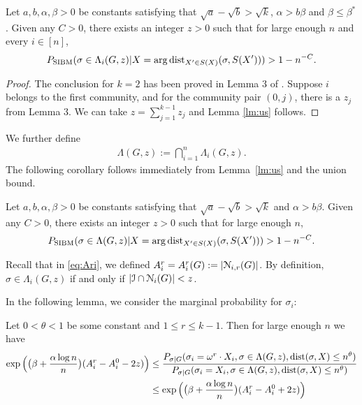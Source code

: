\documentclass{article}
\begin{document}
\begin{lemma} \label{lm:us}
	Let $a,b,\alpha,\beta> 0$ be constants satisfying that $\sqrt{a}-\sqrt{b} > \sqrt{k}$, $\alpha>b\beta$ and $\beta\le \beta^\ast$.
	Given any $C>0$, there exists an integer $z>0$ such that for large enough $n$ and every $i\in[n]$, 
	\begin{equation} \label{eq:zr}
	P_{\operatorname{SIBM}} (\sigma\in \Lambda_i(G, z)
	| X = \arg\operatorname{dist}_{X'\in S(X)}(\sigma, S(X')))
	> 1 - n^{-C} .
	\end{equation}
\end{lemma}
\begin{proof}
	The conclusion for $k=2$ has been proved in Lemma 3 of \cite{ye2020exact}. Suppose $i$ belongs to the first community, and for the community
	pair $(0, j)$, there is a $z_{j}$ from Lemma 3.
	We can take $z = \sum_{j=1}^{k-1} z_j$ and Lemma \ref{lm:us} follows.
\end{proof}
We further define 
\begin{align*}
\Lambda(G, z) :=
\bigcap_{i=1}^n
\Lambda_i(G, z) .
\end{align*}
The following corollary follows immediately from Lemma~\ref{lm:us} and the union bound.
\begin{corollary} \label{cr:1}
	Let $a,b,\alpha,\beta> 0$ be constants satisfying that $\sqrt{a}-\sqrt{b} > \sqrt{k}$ and $\alpha>b\beta$.
	Given any $C>0$, there exists an integer $z>0$ such that for large enough $n$, 
	$$
	P_{\operatorname{SIBM}} (\sigma\in \Lambda(G, z)
	| X = \arg\operatorname{dist}_{X'\in S(X)}(\sigma, S(X')) )
	> 1 - n^{-C} .
	$$
\end{corollary}

Recall that in \eqref{eq:Ari}, we defined $A^r_i=A^r_i(G):=|\mathcal{N}_{i,r}(G)|$.
By definition, $\sigma \in  \Lambda_i(G,z)$ if and only if $|\mathcal{I}\cap \mathcal{N}_i(G)| < z$.

In the following lemma, we consider the marginal probability for $\sigma_i$:
\begin{lemma} \label{lm:et}
	Let $0<\theta<1$ be some constant and $1\leq r \leq k-1$. Then for large enough $n$ we have
	\begin{align*}
	\exp\Big(\big(\beta+\frac{\alpha\log n}{n} \big) (A^r_i-A^0_i - 2z) \Big) & \le 
	\frac{P_{\sigma|G}(\sigma_i= \omega^r \cdot X_i, \sigma\in \Lambda(G,z) ,\operatorname{dist}(\sigma, X) \le n^{\theta} ) } 
	{ P_{\sigma|G}(\sigma_i=X_i, \sigma\in \Lambda(G,z) ,\operatorname{dist}(\sigma, X) \le n^{\theta} ) } \\
	& \le \exp\Big(\big(\beta+\frac{\alpha\log n}{n} \big) (A^r_i-A^0_i + 2z) \Big)
	\end{align*}
\end{lemma}
\end{document}
